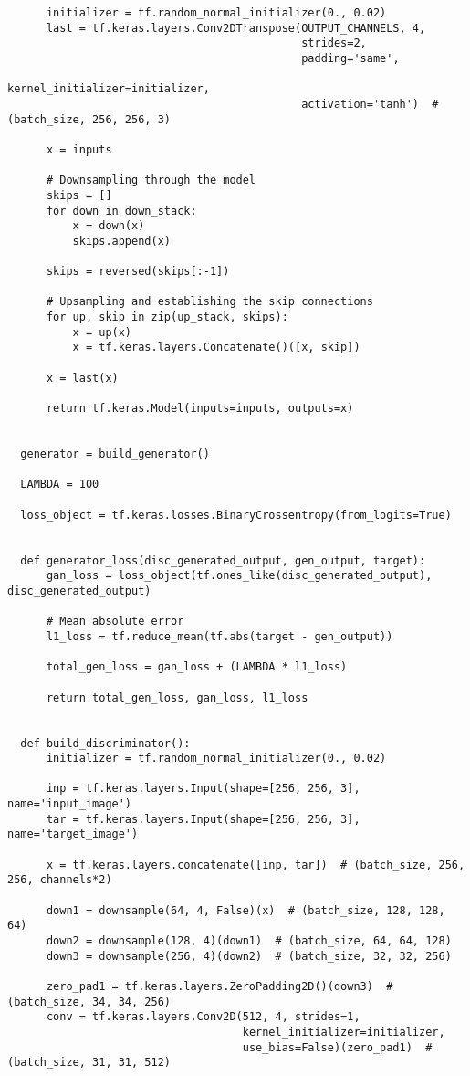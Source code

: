 \begin{lstlisting}
      initializer = tf.random_normal_initializer(0., 0.02)
      last = tf.keras.layers.Conv2DTranspose(OUTPUT_CHANNELS, 4,
                                             strides=2,
                                             padding='same',
                                             kernel_initializer=initializer,
                                             activation='tanh')  # (batch_size, 256, 256, 3)

      x = inputs

      # Downsampling through the model
      skips = []
      for down in down_stack:
          x = down(x)
          skips.append(x)

      skips = reversed(skips[:-1])

      # Upsampling and establishing the skip connections
      for up, skip in zip(up_stack, skips):
          x = up(x)
          x = tf.keras.layers.Concatenate()([x, skip])

      x = last(x)

      return tf.keras.Model(inputs=inputs, outputs=x)


  generator = build_generator()

  LAMBDA = 100

  loss_object = tf.keras.losses.BinaryCrossentropy(from_logits=True)


  def generator_loss(disc_generated_output, gen_output, target):
      gan_loss = loss_object(tf.ones_like(disc_generated_output), disc_generated_output)

      # Mean absolute error
      l1_loss = tf.reduce_mean(tf.abs(target - gen_output))

      total_gen_loss = gan_loss + (LAMBDA * l1_loss)

      return total_gen_loss, gan_loss, l1_loss


  def build_discriminator():
      initializer = tf.random_normal_initializer(0., 0.02)

      inp = tf.keras.layers.Input(shape=[256, 256, 3], name='input_image')
      tar = tf.keras.layers.Input(shape=[256, 256, 3], name='target_image')

      x = tf.keras.layers.concatenate([inp, tar])  # (batch_size, 256, 256, channels*2)

      down1 = downsample(64, 4, False)(x)  # (batch_size, 128, 128, 64)
      down2 = downsample(128, 4)(down1)  # (batch_size, 64, 64, 128)
      down3 = downsample(256, 4)(down2)  # (batch_size, 32, 32, 256)

      zero_pad1 = tf.keras.layers.ZeroPadding2D()(down3)  # (batch_size, 34, 34, 256)
      conv = tf.keras.layers.Conv2D(512, 4, strides=1,
                                    kernel_initializer=initializer,
                                    use_bias=False)(zero_pad1)  # (batch_size, 31, 31, 512)


\end{lstlisting}

